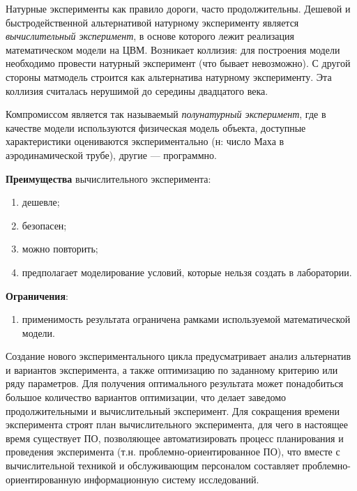 \documentclass[12pt]{article}
\begin{document}
Натурные эксперименты как правило дороги, часто продолжительны. Дешевой и быстродейственной альтернативой натурному эксперименту является \emph{вычислительный эксперимент}, в основе которого лежит реализация математическом модели на ЦВМ. Возникает коллизия: для построения модели  необходимо провести натурный эксперимент (что бывает невозможно). С другой стороны матмодель строится как альтернатива натурному эксперименту. Эта коллизия считалась нерушимой до середины двадцатого века.

Компромиссом является так называемый \emph{полунатурный эксперимент}, где в качестве модели используются физическая модель объекта, доступные характеристики оцениваются экспериментально (н: число Маха в аэродинамической трубе), другие --- программно.

\textbf{Преимущества} вычислительного эксперимента:
\begin{enumerate}
    \item дешевле;
    \item безопасен;
    \item можно повторить;
    \item предполагает моделирование условий, которые нельзя создать в лаборатории.
\end{enumerate}

\textbf{Ограничения}:
\begin{enumerate}
    \item применимость результата ограничена рамками используемой математической модели.
\end{enumerate}


Создание нового экспериментального цикла предусматривает анализ альтернатив и вариантов эксперимента, а также оптимизацию по заданному критерию или ряду параметров. Для получения оптимального результата может понадобиться большое количество вариантов оптимизации, что делает заведомо продолжительными и вычислительный эксперимент. Для сокращения времени эксперимента строят план вычислительного эксперимента, для чего в настоящее время существует ПО, позволяющее автоматизировать процесс планирования и проведения эксперимента (т.н. проблемно-ориентированное ПО), что вместе с вычислительной техникой и обслуживающим персоналом составляет проблемно-ориентированную информационную систему исследований.
\end{document}
